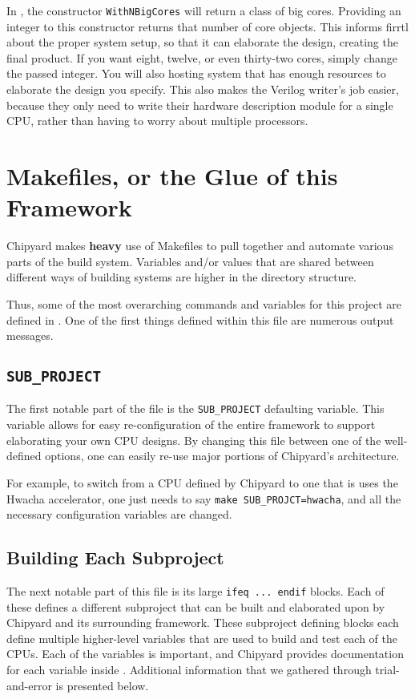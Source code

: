 In , the constructor \texttt{WithNBigCores} will return a class of big  cores.
Providing an integer to this constructor returns that number of core objects.
This informs \gls{firrtl} about the proper system setup, so that it can elaborate the design, creating the final product.
If you want eight, twelve, or even thirty-two cores, simply change the passed integer.
You will also hosting system that has enough resources to elaborate the design you specify.
This also makes the Verilog writer's job easier, because they only need to write their hardware description module for a single CPU, rather than having to worry about multiple processors.

\section{Makefiles, or the Glue of this Framework}\label{sec:Makefiles_in_Chipyard}
Chipyard makes \textbf{heavy} use of Makefiles to pull together and automate various parts of the build system.
Variables and/or values that are shared between different ways of building systems are higher in the directory structure.

Thus, some of the most overarching commands and variables for this project are defined in .
One of the first things defined within this file are numerous output messages.

\subsection{\texttt{SUB\_PROJECT}}\label{subsec:Makefile_SUB_PROJECT}
The first notable part of the  file is the \texttt{SUB\_PROJECT} defaulting variable.
This variable allows for easy re-configuration of the entire framework to support elaborating your own CPU designs.
By changing this file between one of the well-defined options, one can easily re-use major portions of Chipyard's architecture.

For example, to switch from a CPU defined by Chipyard to one that is uses the Hwacha \gls{accelerator}, one just needs to say \texttt{make SUB_PROJCT=hwacha}, and all the necessary configuration variables are changed.

\subsection{Building Each Subproject}\label{subsec:Building_Each_Subproject}
The next notable part of this file is its large \texttt{ifeq ... endif} blocks.
Each of these defines a different subproject that can be built and elaborated upon by Chipyard and its surrounding framework.
These subproject defining blocks each define multiple higher-level variables that are used to build and test each of the CPUs.
Each of the variables is important, and Chipyard provides documentation for each variable inside .
Additional information that we gathered through trial-and-error is presented below.

